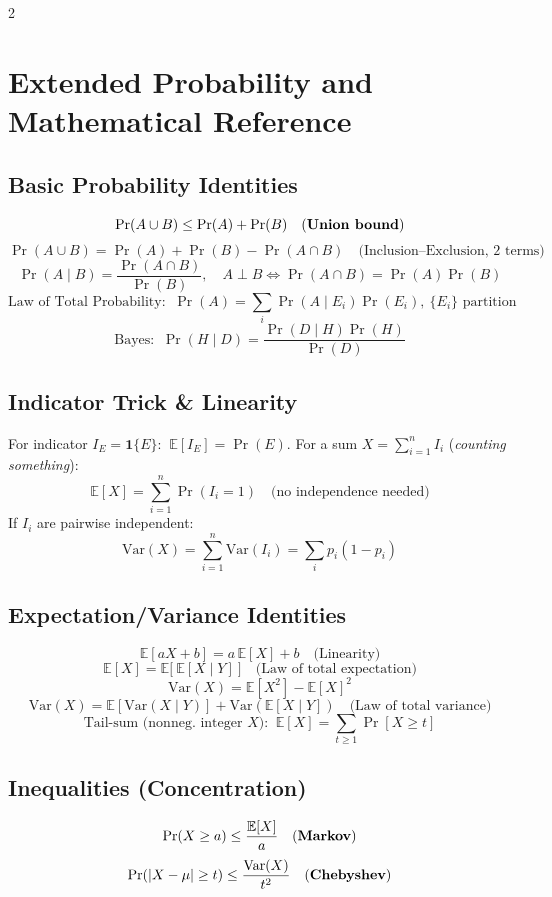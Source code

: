 \documentclass[10pt]{article}
\theoremstyle{definition}
\begin{document}
\begin{multicols*}{2}
\bigskip




\clearpage

\section{Extended Probability and Mathematical Reference}\label{app:formulas}
\subsection{Basic Probability Identities}
\[
\Pr(A\cup B)\le \Pr(A)+\Pr(B)\quad\text{(\textbf{Union bound})}
\]
\[
\Pr(A\cup B)=\Pr(A)+\Pr(B)-\Pr(A\cap B)\quad\text{(Inclusion--Exclusion, 2 terms)}
\]
\[
\Pr(A\mid B)=\frac{\Pr(A\cap B)}{\Pr(B)},\quad A\perp B\iff \Pr(A\cap B)=\Pr(A)\Pr(B)
\]
\[
\text{Law of Total Probability: }\ \Pr(A)=\sum_i \Pr(A\mid E_i)\Pr(E_i),\ \{E_i\}\text{ partition}
\]
\[
\text{Bayes: }\ \Pr(H\mid D)=\frac{\Pr(D\mid H)\Pr(H)}{\Pr(D)}
\]

\subsection{Indicator Trick \& Linearity}
For indicator $I_E=\mathbf{1}\{E\}$: $\ \mathbb{E}[I_E]=\Pr(E)$.
For a sum $X=\sum_{i=1}^n I_i$ (\emph{counting something}):
\[
\mathbb{E}[X]=\sum_{i=1}^n \Pr(I_i=1)\quad\text{(no independence needed)}
\]
If $I_i$ are pairwise independent: 
\[
\mathrm{Var}(X)=\sum_{i=1}^n \mathrm{Var}(I_i)=\sum_i p_i(1-p_i)
\]

\subsection{Expectation/Variance Identities}
\[
\mathbb{E}[aX+b]=a\,\mathbb{E}[X]+b\quad\text{(Linearity)}
\]
\[
\mathbb{E}[X]=\mathbb{E}\big[\ \mathbb{E}[X\mid Y]\ \big]\quad\text{(Law of total expectation)}
\]
\[
\mathrm{Var}(X)=\mathbb{E}[X^2]-\mathbb{E}[X]^2
\]
\[
\mathrm{Var}(X)=\mathbb{E}\!\left[\mathrm{Var}(X\mid Y)\right]+\mathrm{Var}\!\left(\mathbb{E}[X\mid Y]\right)\quad\text{(Law of total variance)}
\]
\[
\text{Tail-sum (nonneg. integer $X$): }\ \mathbb{E}[X]=\sum_{t\ge1}\Pr[X\ge t]
\]

\subsection{Inequalities (Concentration)}
\[
\Pr(X\ge a)\le \frac{\mathbb{E}[X]}{a}\quad\text{(\textbf{Markov})}
\]
\[
\Pr(|X-\mu|\ge t)\le \frac{\mathrm{Var}(X)}{t^2}\quad\text{(\textbf{Chebyshev})}
\]


\end{multicols*}
\end{document}
